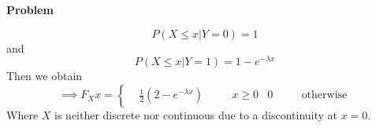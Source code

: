 \documentclass[12pt]{article}
\newenvironment{Ex}{\textbf{Problem}\vspace{.75em}\\}{}
\begin{document}
\begin{enumerate}
\begin{Ex}
\begin{solution}
\begin{equation}
        \label{eq:7-p-y-0}
        P(X\le x|Y=0) = 1
      \end{equation}
      and
      \begin{equation}
        \label{eq:7-p-y-1}
        P(X\le x|Y=1) = 1-e^{-\lambda x}
      \end{equation}
      Then we obtain
      \begin{equation}
        \label{eq:7-sol}
        \implies F_X{x} = \left\{
          \begin{aligned}
            & \frac{1}{2}(2-e^{-\lambda x}) &&\quad x\ge 0
            & 0 &&\quad\text{otherwise}
          \end{aligned}
        \end{equation}
        Where $X$ is neither discrete nor continuous due to a
        discontinuity at $x=0$.
      \end{solution}
    \end{Ex}
  \end{enumerate}
\end{document}

